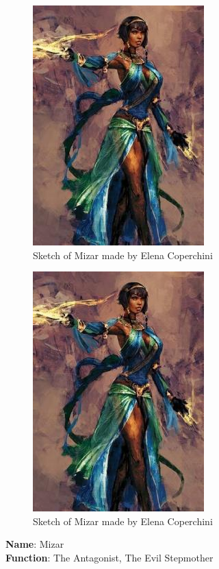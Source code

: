 \hfill\begin{minipage}{0.4\textwidth}
  \begin{figure}[H]
  \includegraphics{Images/Characters/mizar}
  \caption{Sketch of Mizar made by Elena Coperchini}
\end{figure}
\end{minipage}


\begin{figure}[H]
  \includegraphics{Images/Characters/mizar}
  \caption{Sketch of Mizar made by Elena Coperchini}
\end{figure}

\textbf{Name}: Mizar\\
\textbf{Function}: The Antagonist, The Evil Stepmother

